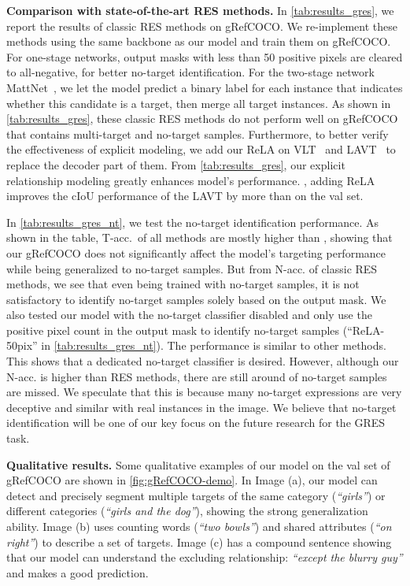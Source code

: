 \documentclass[10pt,twocolumn,letterpaper]{article}
\newcommand{\ntacc}{N-acc.\xspace}
\newcommand{\tacc}{T-acc.\xspace}
\begin{document}
\textbf{Comparison with state-of-the-art RES methods.} In \cref{tab:results_gres}, we report the results of classic RES methods on gRefCOCO.
We re-implement these methods using the same backbone as our model and train them on gRefCOCO. 
For one-stage networks, output masks with less than 50 positive pixels are cleared to all-negative, for better no-target identification.
For the two-stage network MattNet~\cite{yu2018mattnet}, we let the model predict a binary label for each instance that indicates whether this candidate is a target, then merge all target instances. 
As shown in \cref{tab:results_gres}, these classic RES methods do not perform well on gRefCOCO that contains multi-target and no-target samples. Furthermore, to better verify the effectiveness of explicit modeling, we add our ReLA on VLT~\cite{ding2021vision} and LAVT~\cite{yang2021lavt} to replace the decoder part of them. From \cref{tab:results_gres}, our explicit relationship modeling greatly enhances model's performance. \Eg, adding ReLA improves the cIoU performance of the LAVT by more than  on the val set.


In \cref{tab:results_gres_nt}, we test the no-target identification performance. 
As shown in the table, \tacc~of all methods are mostly higher than , showing that our gRefCOCO does not significantly affect the model's targeting performance while being generalized to no-target samples. 
But from \ntacc of classic RES methods, we see that even being trained with
no-target samples, it is not satisfactory to identify no-target samples solely based on the output mask. We also tested our model with the no-target classifier disabled and only use the positive pixel count in the output mask to identify no-target samples (``{ReLA}-50pix'' in \cref{tab:results_gres_nt}). The performance is similar to other methods. This shows that a dedicated no-target classifier is desired. 
However, although our \ntacc is higher than RES methods, there 
are still around  of no-target samples are missed. 
We speculate that this is because many no-target expressions are very deceptive and similar with real instances in the image. We believe that no-target identification will be one of our key focus on the future research for the GRES task.

\textbf{Qualitative results.} Some qualitative examples of our model on the val set of gRefCOCO are shown in \cref{fig:gRefCOCO-demo}. In Image (a), our model can detect and precisely segment multiple targets of the same category (\textit{``girls''}) or different categories (\textit{``girls and the dog''}), showing the strong generalization ability. Image (b) uses counting words (\textit{``two bowls''}) and shared attributes (\textit{``on right''}) to describe a set of targets. Image (c) has a compound sentence showing that our model can understand the excluding relationship: \textit{``except the blurry guy''} and makes a good prediction. 
\end{document}
